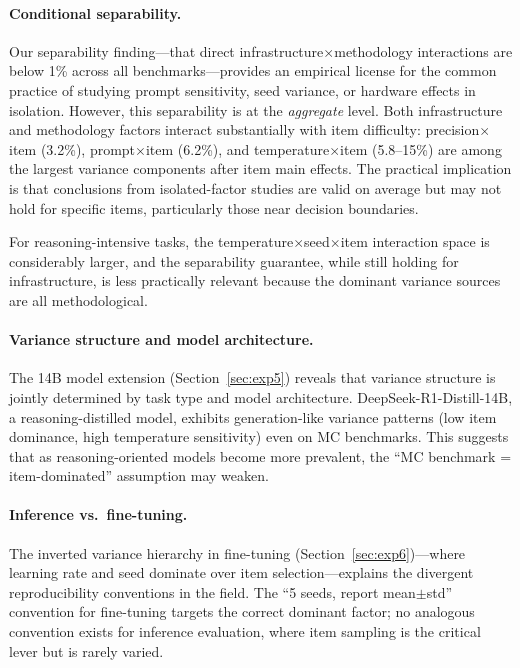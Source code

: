 \documentclass[11pt]{article}
\begin{document}
\paragraph{Conditional separability.}
Our separability finding---that direct infrastructure$\times$methodology interactions are below 1\% across all benchmarks---provides an empirical license for the common practice of studying prompt sensitivity, seed variance, or hardware effects in isolation.
However, this separability is at the \emph{aggregate} level.
Both infrastructure and methodology factors interact substantially with item difficulty: precision$\times$item (3.2\%), prompt$\times$item (6.2\%), and temperature$\times$item (5.8--15\%) are among the largest variance components after item main effects.
The practical implication is that conclusions from isolated-factor studies are valid on average but may not hold for specific items, particularly those near decision boundaries.

For reasoning-intensive tasks, the temperature$\times$seed$\times$item interaction space is considerably larger, and the separability guarantee, while still holding for infrastructure, is less practically relevant because the dominant variance sources are all methodological.

\paragraph{Variance structure and model architecture.}
The 14B model extension (Section~\ref{sec:exp5}) reveals that variance structure is jointly determined by task type and model architecture.
DeepSeek-R1-Distill-14B, a reasoning-distilled model, exhibits generation-like variance patterns (low item dominance, high temperature sensitivity) even on MC benchmarks.
This suggests that as reasoning-oriented models become more prevalent, the ``MC benchmark = item-dominated'' assumption may weaken.

\paragraph{Inference vs.\ fine-tuning.}
The inverted variance hierarchy in fine-tuning (Section~\ref{sec:exp6})---where learning rate and seed dominate over item selection---explains the divergent reproducibility conventions in the field.
The ``5 seeds, report mean$\pm$std'' convention for fine-tuning targets the correct dominant factor; no analogous convention exists for inference evaluation, where item sampling is the critical lever but is rarely varied.
\end{document}
